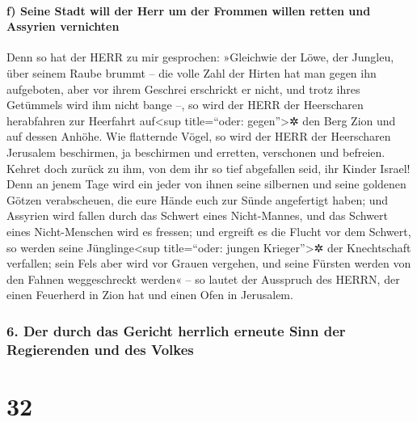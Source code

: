 \hypertarget{f-seine-stadt-will-der-herr-um-der-frommen-willen-retten-und-assyrien-vernichten}{%
\paragraph{f) Seine Stadt will der Herr um der Frommen willen retten und
Assyrien
vernichten}\label{f-seine-stadt-will-der-herr-um-der-frommen-willen-retten-und-assyrien-vernichten}}

Denn so hat der HERR zu mir gesprochen: »Gleichwie der
Löwe, der Jungleu, über seinem Raube brummt -- die volle Zahl der Hirten
hat man gegen ihn aufgeboten, aber vor ihrem Geschrei erschrickt er
nicht, und trotz ihres Getümmels wird ihm nicht bange --, so wird der
HERR der Heerscharen herabfahren zur Heerfahrt auf\textless sup
title=``oder: gegen''\textgreater✲ den Berg Zion und auf dessen Anhöhe.
Wie flatternde Vögel, so wird der HERR der Heerscharen
Jerusalem beschirmen, ja beschirmen und erretten, verschonen und
befreien. Kehret doch zurück zu ihm, von dem ihr so tief
abgefallen seid, ihr Kinder Israel! Denn an jenem Tage
wird ein jeder von ihnen seine silbernen und seine goldenen Götzen
verabscheuen, die eure Hände euch zur Sünde angefertigt haben;
und Assyrien wird fallen durch das Schwert eines
Nicht-Mannes, und das Schwert eines Nicht-Menschen wird es fressen; und
ergreift es die Flucht vor dem Schwert, so werden seine
Jünglinge\textless sup title=``oder: jungen Krieger''\textgreater✲ der
Knechtschaft verfallen; sein Fels aber wird vor Grauen
vergehen, und seine Fürsten werden von den Fahnen weggeschreckt werden«
-- so lautet der Ausspruch des HERRN, der einen Feuerherd in Zion hat
und einen Ofen in Jerusalem.

\hypertarget{der-durch-das-gericht-herrlich-erneute-sinn-der-regierenden-und-des-volkes}{%
\subsubsection{6. Der durch das Gericht herrlich erneute Sinn der
Regierenden und des
Volkes}\label{der-durch-das-gericht-herrlich-erneute-sinn-der-regierenden-und-des-volkes}}

\hypertarget{section-31}{%
\section{32}\label{section-31}}

